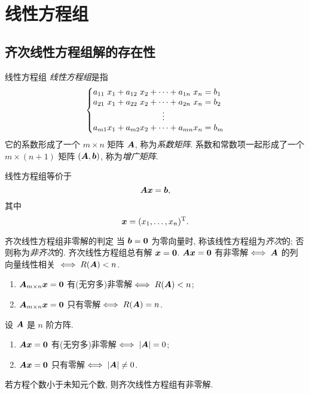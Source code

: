 \section{线性方程组}

\subsection{齐次线性方程组解的存在性}

\begin{frame}{线性方程组}
	\onslide<+->
	\emph{线性方程组}是指
	\[\laeq[lclcclcl]{
		a_{11}&x_1+{}&a_{12}&x_2&{}+\cdots+{}&a_{1n}&x_n={}&b_1\\
		a_{21}&x_1+{}&a_{22}&x_2&{}+\cdots+{}&a_{2n}&x_n={}&b_2\\
		&&&&\vdots&&&\\
		a_{m1}&x_1+{}&a_{m2}&x_2&{}+\cdots+{}&a_{mn}&x_n={}&b_m
	}\]
	\onslide<+->
	它的系数形成了一个 $m\times n$ 矩阵 ${\boldsymbol{A}}$, 称为\emph{系数矩阵}.
	\onslide<+->
	系数和常数项一起形成了一个 $m\times(n+1)$ 矩阵 $({\boldsymbol{A}},{\boldsymbol{b}})$, 称为\emph{增广矩阵}.

	\onslide<+->
	线性方程组等价于
	\[{\boldsymbol{A}}{\boldsymbol{x}}={\boldsymbol{b}},\]
	其中
	\[{\boldsymbol{x}}=(x_1,\dots,x_n)^{\mathrm{T}}.\]
\end{frame}


\begin{frame}{齐次线性方程组非零解的判定}
	\onslide<+->
	当 ${\boldsymbol{b}}={\bf0}$ 为零向量时, 称该线性方程组为\emph{齐次}的; 否则称为\emph{非齐次}的.
	\onslide<+->
	齐次线性方程组总有解 ${\boldsymbol{x}}={\bf0}$.
	\onslide<+->
	${\boldsymbol{A}}{\boldsymbol{x}}={\bf0}$ 有非零解$\iff{\boldsymbol{A}}$ 的列向量线性相关
	\onslide<+->
	$\iff R({\boldsymbol{A}})<n$.
	\onslide<+->
	\begin{theorem}
		\begin{enumerate}
			\item ${\boldsymbol{A}}_{m\times n}{\boldsymbol{x}}={\bf0}$ 有(无穷多)非零解$\iff R({\boldsymbol{A}})<n$;
			\item ${\boldsymbol{A}}_{m\times n}{\boldsymbol{x}}={\bf0}$ 只有零解$\iff R({\boldsymbol{A}})=n$.
		\end{enumerate}
	\end{theorem}
	\onslide<+->
	\begin{corollary}
		设 ${\boldsymbol{A}}$ 是 $n$ 阶方阵.
		\begin{enumerate}
			\item ${\boldsymbol{A}}{\boldsymbol{x}}={\bf0}$ 有(无穷多)非零解$\iff |{\boldsymbol{A}}|=0$;
			\item ${\boldsymbol{A}}{\boldsymbol{x}}={\bf0}$ 只有零解$\iff |{\boldsymbol{A}}|\neq0$.
		\end{enumerate}
	\end{corollary}
	\onslide<+->
	\begin{corollary}
		若方程个数小于未知元个数, 则齐次线性方程组有非零解.
	\end{corollary}
\end{frame}


